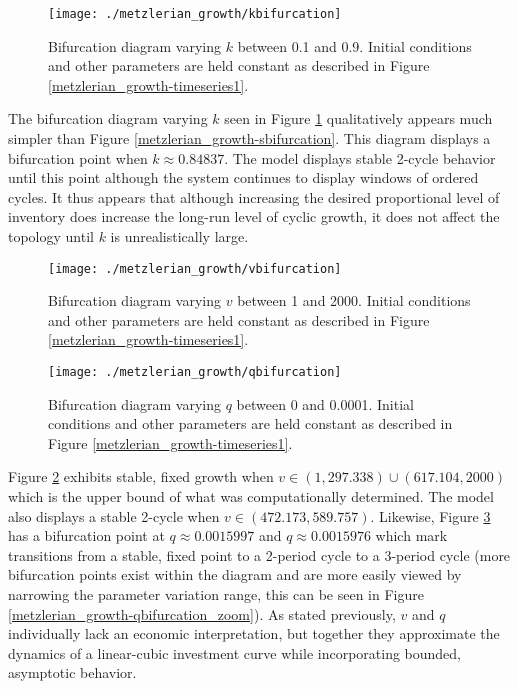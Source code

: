 \begin{figure}
    \centering
    \texttt{[image: ./metzlerian\_growth/kbifurcation]}
    \caption{Bifurcation diagram varying $k$ between 0.1 and 0.9. Initial conditions and other parameters are held constant as described in Figure \ref{metzlerian_growth-timeseries1}.}
    \label{metzlerian_growth-kbifurcation}
\end{figure}

The bifurcation diagram varying $k$ seen in Figure \ref{metzlerian_growth-kbifurcation} qualitatively appears much simpler than Figure \ref{metzlerian_growth-sbifurcation}. This diagram displays a bifurcation point when $k\approx 0.84837$. The model displays stable 2-cycle behavior until this point although the system continues to display windows of ordered cycles. It thus appears that although increasing the desired proportional level of inventory does increase the long-run level of cyclic growth, it does not affect the topology until $k$ is unrealistically large. 

\begin{figure}
    \centering
    \texttt{[image: ./metzlerian\_growth/vbifurcation]}
    \caption{Bifurcation diagram varying $v$ between 1 and 2000. Initial conditions and other parameters are held constant as described in Figure \ref{metzlerian_growth-timeseries1}.}
    \label{metzlerian_growth-vbifurcation}
\end{figure}
\begin{figure}
    \centering
    \texttt{[image: ./metzlerian\_growth/qbifurcation]}
    \caption{Bifurcation diagram varying $q$ between 0 and 0.0001. Initial conditions and other parameters are held constant as described in Figure \ref{metzlerian_growth-timeseries1}.}
    \label{metzlerian_growth-qbifurcation}
\end{figure}

Figure \ref{metzlerian_growth-vbifurcation} exhibits stable, fixed growth when $v\in(1,297.338)\cup(617.104, 2000)$ which is the upper bound of what was computationally determined. The model also displays a stable 2-cycle when $v\in(472.173, 589.757)$. Likewise, Figure \ref{metzlerian_growth-qbifurcation} has a bifurcation point at $q\approx0.0015997$ and $q\approx0.0015976$ which mark transitions from a stable, fixed point to a 2-period cycle to a 3-period cycle (more bifurcation points exist within the diagram and are more easily viewed by narrowing the parameter variation range, this can be seen in Figure \ref{metzlerian_growth-qbifurcation_zoom}). As stated previously, $v$ and $q$ individually lack an economic interpretation, but together they approximate the dynamics of a linear-cubic investment curve while incorporating bounded, asymptotic behavior. 

